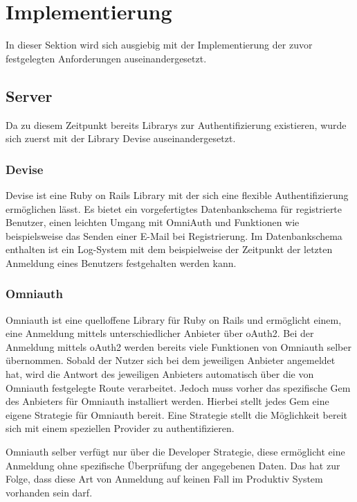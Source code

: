 \section{Implementierung}
\label{sec: implementation}
In dieser Sektion wird sich ausgiebig mit der Implementierung der zuvor festgelegten Anforderungen auseinandergesetzt.

\subsection{Server}
\label{sec: server}
Da zu diesem Zeitpunkt bereits Librarys zur Authentifizierung existieren, wurde sich zuerst mit der Library Devise auseinandergesetzt.

\subsubsection{Devise}
\label{sec: devise}
Devise ist eine Ruby on Rails Library mit der sich eine flexible Authentifizierung ermöglichen lässt. Es bietet ein vorgefertigtes Datenbankschema für registrierte Benutzer, einen leichten Umgang mit OmniAuth und Funktionen wie beispielsweise das Senden einer E-Mail bei Registrierung. Im Datenbankschema enthalten ist ein Log-System mit dem beispielweise der Zeitpunkt der letzten Anmeldung eines Benutzers festgehalten werden kann. 


\subsubsection{Omniauth}
\label{sec:omniauth}
Omniauth ist eine quelloffene Library für Ruby on Rails und ermöglicht einem, eine Anmeldung mittels unterschiedlicher Anbieter über \gls{oAuth2}. Bei der Anmeldung mittels oAuth2 werden bereits viele Funktionen von Omniauth selber übernommen. Sobald der Nutzer sich bei dem jeweiligen Anbieter angemeldet hat, wird die Antwort des jeweiligen Anbieters automatisch über die von Omniauth festgelegte Route verarbeitet. Jedoch muss vorher das spezifische Gem des Anbieters für Omniauth installiert werden. Hierbei stellt jedes Gem eine eigene Strategie für Omniauth bereit. Eine Strategie stellt die Möglichkeit bereit sich mit einem speziellen Provider zu authentifizieren.

Omniauth selber verfügt nur über die Developer Strategie, diese ermöglicht eine Anmeldung ohne spezifische Überprüfung der angegebenen Daten. Das hat zur Folge, dass diese Art von Anmeldung auf keinen Fall im Produktiv System vorhanden sein darf.

